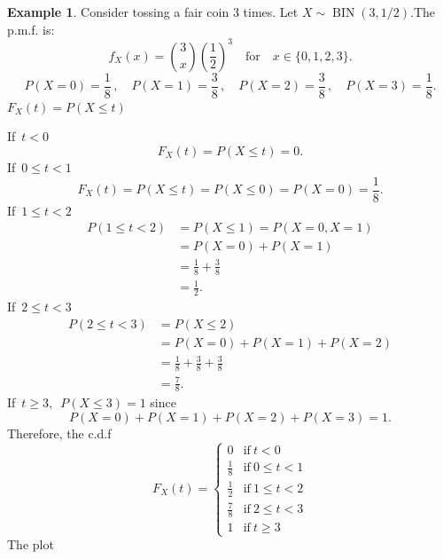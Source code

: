 \documentclass[12pt,a4paper]{report}
\theoremstyle{definition}
\newtheorem{example}[thm]{Example}
\theoremstyle{plain}
\theoremstyle{definition}
\begin{document}
\begin{example}Consider tossing a fair coin 3 times. Let $X \sim \operatorname{BIN}(3, 1/2)$.The p.m.f. is: \[f_X(x) = \binom{3}{x} \left(\frac{1}{2}\right)^3\quad \text{for} \quad x \in \{0, 1, 2, 3\}.\]
\[P(X = 0) = \frac{1}{8}\, ,\quad P(X = 1) = \frac{3}{8}\, ,\quad P(X = 2) = \frac{3}{8}\, , \quad P(X = 3) = \frac{1}{8}.\]
$F_X(t)=P(X\leq t)$

If $\, t < 0$ 
\[F_X(t)=P(X\leq t)=0.\]
If $\, 0\leq t<1$
\[F_X(t)=P(X\leq t)=P(X\leq 0)=P(X=0)=\frac{1}{8}.\]
If $\, 1 \leq t < 2$
\begin{align*}
P(1\leq t< 2) & = P(X\leq 1)=P(X=0,X=1)\\
              & = P(X=0)+P(X=1)\\
              & = \frac{1}{8}+\frac{3}{8}\\
              & = \frac{1}{2}.
\end{align*}
If $\, 2 \leq t < 3$
\begin{align*}
P(2 \leq t < 3) & = P(X\leq 2)\\
& = P(X = 0) + P(X = 1) + P(X = 2)\\
& = \frac{1}{8}+\frac{3}{8}+\frac{3}{8}\\
& =\frac{7}{8}.
\end{align*}
If $\, t\geq 3,$ $\,P(X\leq 3)=1$ since \[P(X=0)+P(X=1)+P(X=2)+P(X=3)=1.\]
Therefore, the c.d.f 
\[F_X(t)=
\begin{cases}
0 & \text{if}\ t<0\\[1ex]
\frac{1}{8} & \text{if}\  0\leq t<1\\[1ex]
\frac{1}{2} & \text{if}\  1\leq t<2\\[1ex]
\frac{7}{8} & \text{if}\  2\leq t<3\\[1ex]
1 & \text{if} \  t\geq 3
\end{cases}
\]
The plot
\begin{figure}[H]
\centering
{}
\end{figure}
\end{example}
\end{document}
